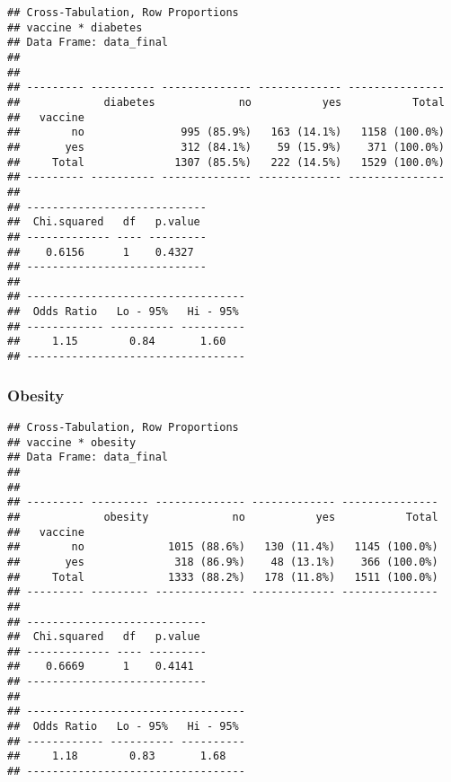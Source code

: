 \documentclass[
]{article}
\newenvironment{Shaded}{\begin{snugshade}}{\end{snugshade}}
\newcommand{\AttributeTok}[1]{\textcolor[rgb]{0.77,0.63,0.00}{#1}}
\newcommand{\ConstantTok}[1]{\textcolor[rgb]{0.00,0.00,0.00}{#1}}
\newcommand{\FunctionTok}[1]{\textcolor[rgb]{0.00,0.00,0.00}{#1}}
\newcommand{\NormalTok}[1]{#1}
\newcommand{\SpecialCharTok}[1]{\textcolor[rgb]{0.00,0.00,0.00}{#1}}
\newcommand{\StringTok}[1]{\textcolor[rgb]{0.31,0.60,0.02}{#1}}
\begin{document}
\begin{verbatim}
## Cross-Tabulation, Row Proportions  
## vaccine * diabetes  
## Data Frame: data_final  
## 
## 
## --------- ---------- -------------- ------------- ---------------
##             diabetes             no           yes           Total
##   vaccine                                                        
##        no               995 (85.9%)   163 (14.1%)   1158 (100.0%)
##       yes               312 (84.1%)    59 (15.9%)    371 (100.0%)
##     Total              1307 (85.5%)   222 (14.5%)   1529 (100.0%)
## --------- ---------- -------------- ------------- ---------------
## 
## ----------------------------
##  Chi.squared   df   p.value 
## ------------- ---- ---------
##    0.6156      1    0.4327  
## ----------------------------
## 
## ----------------------------------
##  Odds Ratio   Lo - 95%   Hi - 95% 
## ------------ ---------- ----------
##     1.15        0.84       1.60   
## ----------------------------------
\end{verbatim}

\hypertarget{obesity}{%
\subsubsection{Obesity}\label{obesity}}

\begin{Shaded}
\end{Shaded}

\begin{verbatim}
## Cross-Tabulation, Row Proportions  
## vaccine * obesity  
## Data Frame: data_final  
## 
## 
## --------- --------- -------------- ------------- ---------------
##             obesity             no           yes           Total
##   vaccine                                                       
##        no             1015 (88.6%)   130 (11.4%)   1145 (100.0%)
##       yes              318 (86.9%)    48 (13.1%)    366 (100.0%)
##     Total             1333 (88.2%)   178 (11.8%)   1511 (100.0%)
## --------- --------- -------------- ------------- ---------------
## 
## ----------------------------
##  Chi.squared   df   p.value 
## ------------- ---- ---------
##    0.6669      1    0.4141  
## ----------------------------
## 
## ----------------------------------
##  Odds Ratio   Lo - 95%   Hi - 95% 
## ------------ ---------- ----------
##     1.18        0.83       1.68   
## ----------------------------------
\end{verbatim}
\end{document}
